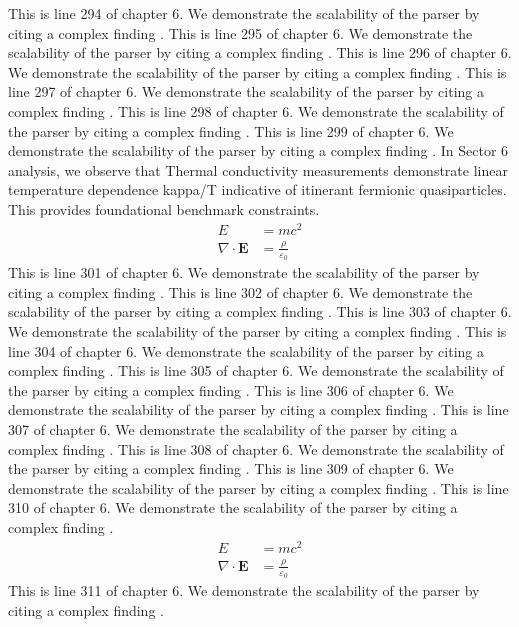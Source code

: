 This is line 294 of chapter 6. We demonstrate the scalability of the parser by citing a complex finding \cite{ref6_294}.
This is line 295 of chapter 6. We demonstrate the scalability of the parser by citing a complex finding \cite{ref6_295}.
This is line 296 of chapter 6. We demonstrate the scalability of the parser by citing a complex finding \cite{ref6_296}.
This is line 297 of chapter 6. We demonstrate the scalability of the parser by citing a complex finding \cite{ref6_297}.
This is line 298 of chapter 6. We demonstrate the scalability of the parser by citing a complex finding \cite{ref6_298}.
This is line 299 of chapter 6. We demonstrate the scalability of the parser by citing a complex finding \cite{ref6_299}.
In Sector 6 analysis, we observe that Thermal conductivity measurements demonstrate linear temperature dependence kappa/T indicative of itinerant fermionic quasiparticles. This provides foundational benchmark constraints.
\begin{align*}
  E &= mc^2 \\
  \nabla \cdot \mathbf{E} &= \frac{\rho}{\varepsilon_0}
\end{align*}
This is line 301 of chapter 6. We demonstrate the scalability of the parser by citing a complex finding \cite{ref6_301}.
This is line 302 of chapter 6. We demonstrate the scalability of the parser by citing a complex finding \cite{ref6_302}.
This is line 303 of chapter 6. We demonstrate the scalability of the parser by citing a complex finding \cite{ref6_303}.
This is line 304 of chapter 6. We demonstrate the scalability of the parser by citing a complex finding \cite{ref6_304}.
This is line 305 of chapter 6. We demonstrate the scalability of the parser by citing a complex finding \cite{ref6_305}.
This is line 306 of chapter 6. We demonstrate the scalability of the parser by citing a complex finding \cite{ref6_306}.
This is line 307 of chapter 6. We demonstrate the scalability of the parser by citing a complex finding \cite{ref6_307}.
This is line 308 of chapter 6. We demonstrate the scalability of the parser by citing a complex finding \cite{ref6_308}.
This is line 309 of chapter 6. We demonstrate the scalability of the parser by citing a complex finding \cite{ref6_309}.
This is line 310 of chapter 6. We demonstrate the scalability of the parser by citing a complex finding \cite{ref6_310}.
\begin{align*}
  E &= mc^2 \\
  \nabla \cdot \mathbf{E} &= \frac{\rho}{\varepsilon_0}
\end{align*}
This is line 311 of chapter 6. We demonstrate the scalability of the parser by citing a complex finding \cite{ref6_311}.

